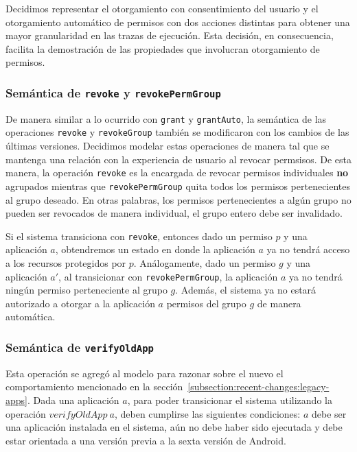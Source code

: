 Decidimos representar el otorgamiento con consentimiento del usuario y el otorgamiento automático de
permisos con dos acciones distintas para obtener una mayor granularidad en las trazas de ejecución.
Esta decisión, en consecuencia, facilita la demostración de las propiedades que involucran
otorgamiento de permisos.

\subsubsection{Semántica de \texttt{revoke} y \texttt{revokePermGroup}}

De manera similar a lo ocurrido con \texttt{grant} y \texttt{grantAuto}, la semántica de las
operaciones  \texttt{revoke} y \texttt{revokeGroup} también se modificaron con los cambios de las
últimas versiones. Decidimos modelar estas operaciones de manera tal que se mantenga una relación
con la experiencia de usuario al revocar permsisos. De esta manera, la operación \texttt{revoke} es
la encargada de revocar permisos individuales \textbf{no} agrupados mientras que
\texttt{revokePermGroup} quita todos los permisos pertenecientes al grupo deseado. En otras
palabras, los permisos pertenecientes a algún grupo no pueden ser revocados de manera individual, el
grupo entero debe ser invalidado.

Si el sistema transiciona con \texttt{revoke}, entonces dado un permiso $p$ y una aplicación $a$,
obtendremos un estado en donde la aplicación $a$ ya no tendrá acceso a los recursos protegidos por
$p$. Análogamente, dado un permiso $g$ y una aplicación $a'$, al transicionar con
\texttt{revokePermGroup}, la aplicación $a$ ya no tendrá ningún permiso perteneciente al grupo $g$.
Además, el sistema ya no estará autorizado a otorgar a la aplicación $a$ permisos del grupo $g$ de
manera automática.


\subsubsection{Semántica de \texttt{verifyOldApp}}

Esta operación se agregó al modelo para razonar sobre el nuevo el comportamiento mencionado en la
sección~\ref{subsection:recent-changes:legacy-apps}. Dada una aplicación $a$, para poder
transicionar el sistema utilizando la operación $verifyOldApp\ a$, deben cumplirse las siguientes
condiciones: $a$ debe ser una aplicación instalada en el sistema, aún no debe haber sido ejecutada y
debe estar orientada a una versión previa a la sexta versión de Android.

